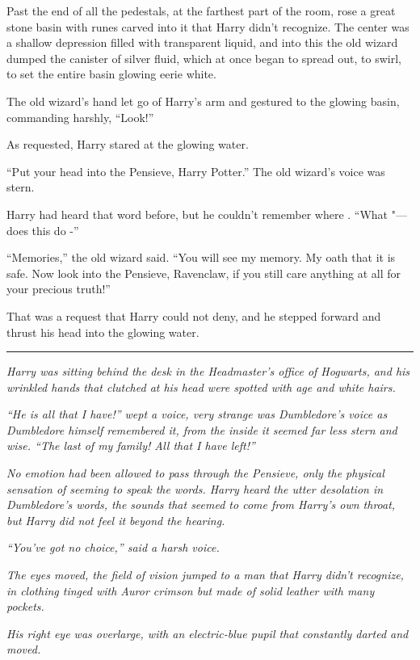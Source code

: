 Past the end of all the pedestals, at the farthest part of the room,
rose a great stone basin with runes carved into it that Harry didn't
recognize. The center was a shallow depression filled with transparent
liquid, and into this the old wizard dumped the canister of silver
fluid, which at once began to spread out, to swirl, to set the entire
basin glowing eerie white.

The old wizard's hand let go of Harry's arm and gestured to the glowing
basin, commanding harshly, ``Look!''

As requested, Harry stared at the glowing water.

``Put your head into the Pensieve, Harry Potter.'' The old wizard's
voice was stern.

Harry had heard that word before, but he couldn't remember where .
``What "--- does this do -''

``Memories,'' the old wizard said. ``You will see my memory. My oath
that it is safe. Now look into the Pensieve, Ravenclaw, if you still
care anything at all for your precious truth!''

That was a request that Harry could not deny, and he stepped forward and
thrust his head into the glowing water.

\begin{center}\rule{3in}{0.4pt}\end{center}

\emph{Harry was sitting behind the desk in the Headmaster's office of
Hogwarts, and his wrinkled hands that clutched at his head were spotted
with age and white hairs.}

\emph{``He is all that I have!'' wept a voice, very strange was
Dumbledore's voice as Dumbledore himself remembered it, from the inside
it seemed far less stern and wise. ``The last of my family! All that I
have left!''}

\emph{No emotion had been allowed to pass through the Pensieve, only the
physical sensation of seeming to speak the words. Harry heard the utter
desolation in Dumbledore's words, the sounds that seemed to come from
Harry's own throat, but Harry did not feel it beyond the hearing.}

\emph{``You've got no choice,'' said a harsh voice.}

\emph{The eyes moved, the field of vision jumped to a man that Harry
didn't recognize, in clothing tinged with Auror crimson but made of
solid leather with many pockets.}

\emph{His right eye was overlarge, with an electric-blue pupil that
constantly darted and moved.}


